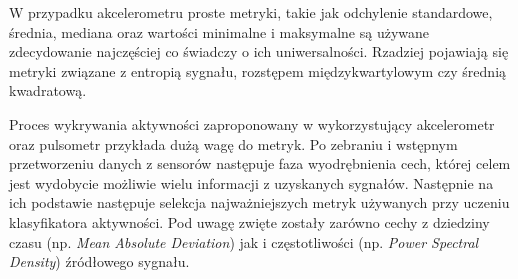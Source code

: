 
W przypadku akcelerometru proste metryki, takie jak odchylenie standardowe, średnia, mediana oraz wartości minimalne i maksymalne są używane zdecydowanie najczęściej co świadczy o ich uniwersalności. Rzadziej pojawiają się metryki związane z entropią sygnału, rozstępem międzykwartylowym czy średnią kwadratową.

Proces wykrywania aktywności zaproponowany w \cite{4_HAR_Features} wykorzystujący akcelerometr oraz pulsometr przykłada dużą wagę do metryk. Po zebraniu i wstępnym przetworzeniu danych z sensorów następuje faza wyodrębnienia cech, której celem jest wydobycie możliwie wielu informacji z uzyskanych sygnałów. Następnie na ich podstawie następuje selekcja najważniejszych metryk używanych przy uczeniu klasyfikatora aktywności. Pod uwagę zwięte zostały zarówno cechy z dziedziny czasu (np. {\it Mean Absolute Deviation}) jak i częstotliwości (np. {\it Power Spectral Density}) źródłowego sygnału.

